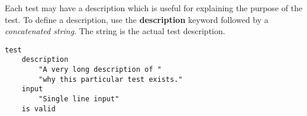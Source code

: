 

Each test may have a description which is useful for explaining the purpose
of the test. To define a description, use the \textbf{description} keyword
followed by a \textit{concatenated string}. The string is the actual test 
description.

\begin{lstlisting}[style = SrtL]
test
    description
        "A very long description of "
        "why this particular test exists."
    input 
        "Single line input"
    is valid
\end{lstlisting}
